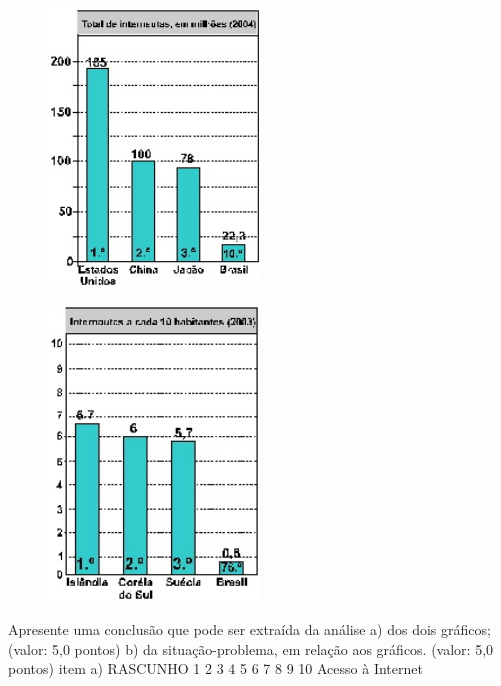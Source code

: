\documentclass{exam}
\begin{document}
\begin{questions}
\begin{figure}[H]
	\begin{center}
		\includegraphics[width=0.5\textwidth]{CIENCIA_DA_COMPUTACAO_Prova2005-utf8_figuras/fig-0007.jpg}
	\end{center}
\end{figure}

\begin{figure}[H]
	\begin{center}
		\includegraphics[width=0.5\textwidth]{CIENCIA_DA_COMPUTACAO_Prova2005-utf8_figuras/fig-0008.jpg}
	\end{center}
\end{figure}
Apresente uma conclusão que pode ser extraída da análise
a) dos dois gráficos; (valor: 5,0 pontos)
b) da situação-problema, em relação aos gráficos. (valor: 5,0 pontos)
item a) RASCUNHO
1
2
3
4
5
6
7
8
9
10
Acesso à Internet


\end{questions}
\end{document}

